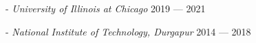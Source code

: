  - \textit{University of Illinois at Chicago}	\hfill 2019 --- 2021

 - \textit{National Institute of Technology, Durgapur} \hfill 2014 --- 2018